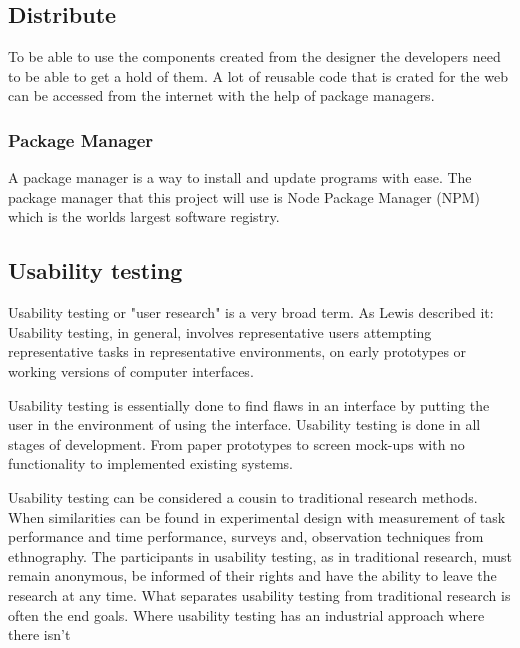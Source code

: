 \subsection{Distribute}%
\label{sub:Distribute}
To be able to use the components created from the designer the developers need to be able to get a hold of them. A lot of reusable code that is crated for the web can be accessed from the internet with the help of package managers.

\subsubsection{Package Manager}%
\label{sub:Package Manager}
\cite{PackageManager2020} 

A package manager is a way to install and update programs with ease. The package manager that this project will use is Node Package Manager (NPM) which is the worlds largest software registry\cite{NpmNpmDocs}.





\subsection{Usability testing}%
\label{sub:User testing}
Usability testing or "user research" is a very broad term. As Lewis \cite{lewis2006usability} described it: Usability testing, in general, involves representative users attempting representative tasks in representative environments, on early prototypes or working versions of computer interfaces.

Usability testing is essentially done to find flaws in an interface by putting the user in the environment of using the interface. Usability testing is done in all stages of development. From paper prototypes to screen mock-ups with no functionality to implemented existing systems. 

Usability testing can be considered a cousin to traditional research methods. When similarities can be found in experimental design with measurement of task performance and time performance, surveys and, observation techniques from ethnography. The participants in usability testing, as in traditional research, must remain anonymous, be informed of their rights and have the ability to leave the research at any time. 
What separates usability testing from traditional research is often the end goals. Where usability testing has an industrial approach where there isn't 

